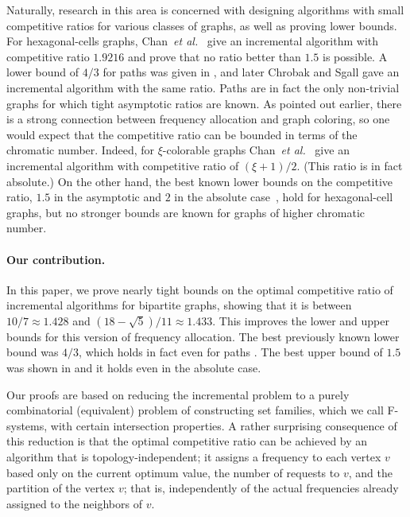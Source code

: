 \documentclass[11pt]{article}
\newcommand{\etal}{{\em et al.}}
\begin{document}
Naturally, research in this area is concerned with designing
algorithms with small competitive ratios for various classes of graphs, 
as well as proving lower bounds. 
For hexagonal-cells graphs, Chan~{\etal}~\cite{ChChYZ07,ChChYZ10} 
give an incremental algorithm with competitive ratio $1.9216$ and
prove that no ratio better than $1.5$ is possible. A lower bound
of $4/3$ for paths was given in \cite{ChCYZZ06}, and later
Chrobak and Sgall \cite{ChrSga10} gave an incremental algorithm with
the same ratio. Paths are in fact the only non-trivial graphs for which tight
asymptotic ratios are known. As pointed out earlier, there is a strong
connection between frequency allocation and graph coloring, so one would
expect that the competitive ratio can be bounded in terms of the chromatic
number. Indeed, for $\xi$-colorable graphs Chan~{\etal}~\cite{ChChYZ07,ChChYZ10}
give an incremental algorithm with competitive ratio of $(\xi+1)/2$.
(This ratio is in fact absolute.)
On the other hand, the best known lower bounds on the competitive ratio,
$1.5$ in the asymptotic and $2$ in the absolute case~\cite{ChChYZ07,ChChYZ10},
hold for hexagonal-cell graphs, but no stronger bounds are known for graphs
of higher chromatic number.



\paragraph{Our contribution.}
In this paper, we prove nearly tight bounds on the optimal competitive ratio of
incremental algorithms for bipartite graphs, showing that it is between 
$10/7\approx 1.428$ and $(18-\sqrt{5})/11\approx 1.433$.
This improves the lower and upper bounds for this version of frequency allocation.
The best previously known lower bound was $4/3$, which
holds in fact even for paths \cite{ChCYZZ06,ChrSga10}. The best upper
bound of $1.5$ was shown in \cite{ChChYZ07,ChChYZ10} and it holds even
in the absolute case. 

Our proofs are based on reducing the incremental problem to a purely 
combinatorial (equivalent) problem of 
constructing set families, which we call F-systems, with certain intersection properties.
A rather surprising consequence of this reduction is
that the optimal competitive ratio can be achieved
by an algorithm that is topology-independent; it assigns
a frequency to each vertex $v$ based only on the current optimum value,
the number of requests to $v$, and the partition of the vertex $v$;
that is, independently of the actual frequencies already
assigned to the neighbors of $v$.
\end{document}
